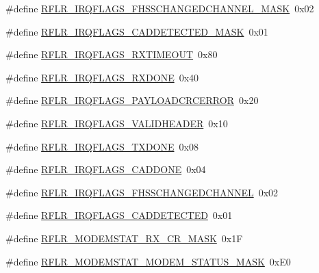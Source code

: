 \begin{DoxyCompactItemize}
\item 
\#define \mbox{\hyperlink{sx1276_regs-_lo_ra_8h_ae0250cb5809f0702a43eb235823acc44}{R\+F\+L\+R\+\_\+\+I\+R\+Q\+F\+L\+A\+G\+S\+\_\+\+F\+H\+S\+S\+C\+H\+A\+N\+G\+E\+D\+C\+H\+A\+N\+N\+E\+L\+\_\+\+M\+A\+SK}}~0x02
\item 
\#define \mbox{\hyperlink{sx1276_regs-_lo_ra_8h_a0d8e41b65bd4af8f19dfad50b7dcad97}{R\+F\+L\+R\+\_\+\+I\+R\+Q\+F\+L\+A\+G\+S\+\_\+\+C\+A\+D\+D\+E\+T\+E\+C\+T\+E\+D\+\_\+\+M\+A\+SK}}~0x01
\item 
\#define \mbox{\hyperlink{sx1276_regs-_lo_ra_8h_a12d5b2ce439396e7033053c929b815bf}{R\+F\+L\+R\+\_\+\+I\+R\+Q\+F\+L\+A\+G\+S\+\_\+\+R\+X\+T\+I\+M\+E\+O\+UT}}~0x80
\item 
\#define \mbox{\hyperlink{sx1276_regs-_lo_ra_8h_a7bdc1e0f642b272cef8fc3f81ab8d95e}{R\+F\+L\+R\+\_\+\+I\+R\+Q\+F\+L\+A\+G\+S\+\_\+\+R\+X\+D\+O\+NE}}~0x40
\item 
\#define \mbox{\hyperlink{sx1276_regs-_lo_ra_8h_a2b91f96d488f7d08d8fd543a7a5eb76b}{R\+F\+L\+R\+\_\+\+I\+R\+Q\+F\+L\+A\+G\+S\+\_\+\+P\+A\+Y\+L\+O\+A\+D\+C\+R\+C\+E\+R\+R\+OR}}~0x20
\item 
\#define \mbox{\hyperlink{sx1276_regs-_lo_ra_8h_a56f64bf676430c4ce2cc672d3bfde2b8}{R\+F\+L\+R\+\_\+\+I\+R\+Q\+F\+L\+A\+G\+S\+\_\+\+V\+A\+L\+I\+D\+H\+E\+A\+D\+ER}}~0x10
\item 
\#define \mbox{\hyperlink{sx1276_regs-_lo_ra_8h_a15a27d43d8ec6b82bcd31857c35e9f09}{R\+F\+L\+R\+\_\+\+I\+R\+Q\+F\+L\+A\+G\+S\+\_\+\+T\+X\+D\+O\+NE}}~0x08
\item 
\#define \mbox{\hyperlink{sx1276_regs-_lo_ra_8h_a44fee83993ca42bbd77370fc82c2fc91}{R\+F\+L\+R\+\_\+\+I\+R\+Q\+F\+L\+A\+G\+S\+\_\+\+C\+A\+D\+D\+O\+NE}}~0x04
\item 
\#define \mbox{\hyperlink{sx1276_regs-_lo_ra_8h_a781c17401f3c0f94e56cd76d43ca0271}{R\+F\+L\+R\+\_\+\+I\+R\+Q\+F\+L\+A\+G\+S\+\_\+\+F\+H\+S\+S\+C\+H\+A\+N\+G\+E\+D\+C\+H\+A\+N\+N\+EL}}~0x02
\item 
\#define \mbox{\hyperlink{sx1276_regs-_lo_ra_8h_a301a9870f807e6c4f54ad608da0549ed}{R\+F\+L\+R\+\_\+\+I\+R\+Q\+F\+L\+A\+G\+S\+\_\+\+C\+A\+D\+D\+E\+T\+E\+C\+T\+ED}}~0x01
\item 
\#define \mbox{\hyperlink{sx1276_regs-_lo_ra_8h_af3688cb4f2ac1d6fe5669af690e813ed}{R\+F\+L\+R\+\_\+\+M\+O\+D\+E\+M\+S\+T\+A\+T\+\_\+\+R\+X\+\_\+\+C\+R\+\_\+\+M\+A\+SK}}~0x1F
\item 
\#define \mbox{\hyperlink{sx1276_regs-_lo_ra_8h_af57dfdb07c9b3873afb53a91443b0565}{R\+F\+L\+R\+\_\+\+M\+O\+D\+E\+M\+S\+T\+A\+T\+\_\+\+M\+O\+D\+E\+M\+\_\+\+S\+T\+A\+T\+U\+S\+\_\+\+M\+A\+SK}}~0x\+E0

\end{DoxyCompactItemize}
